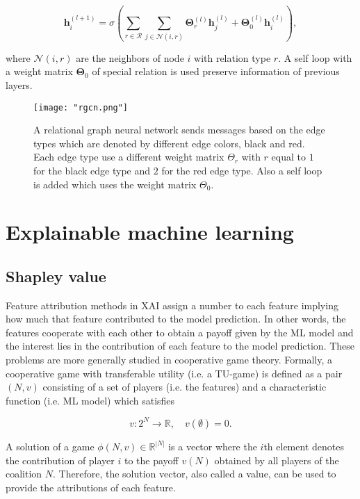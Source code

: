 \begin{equation}
	\pmb{h}^{(l+1)}_i = \sigma \left( \sum_{r \in \mathcal{R}} \sum_{j \in \mathcal{N}(i, r)} \pmb{\Theta}^{(l)}_r \pmb{h}^{(l)}_j
	+ \pmb{\Theta}^{(l)}_0 \pmb{h}^{(l)}_i \right),
\end{equation}


where $\mathcal{N}(i, r)$ are the neighbors of node $i$ with relation type $r$.
A self loop with a weight matrix $\pmb{\Theta}_0$ of special relation
is used preserve information of previous layers.

\begin{figure}[h]
    \centering 
    \texttt{[image: "rgcn.png"]}
    \caption{A relational graph neural network sends messages based on the edge 
    types which are denoted by different edge colors, black and red. Each edge 
    type use a different weight matrix $\Theta_r$ with $r$ equal to $1$ for the black 
    edge type and $2$ for the red edge type. Also a self loop is added which uses 
    the weight matrix $\Theta_0$.}
    \label{fig:rgcn}
\end{figure}


\section{Explainable machine learning}


\subsection{Shapley value}
\label{subsec:shapley_value}

Feature attribution methods in XAI assign a number to each feature implying how
much that feature contributed to the model prediction.\cite{merrick2020explanation}
In other words, the features cooperate with each other to obtain a payoff given
by the ML model and the interest lies in the contribution of each feature to the
model prediction. These problems are more generally studied in cooperative game
theory. Formally, a cooperative game with transferable utility (i.e. a TU-game) is
defined as a pair $(N, v)$ consisting of a set of players (i.e. the features)
and a characteristic function (i.e. ML model) which satisfies\cite{zhang2022gstarx}


\begin{equation}
	v: 2^N \rightarrow \mathbb{R}, \quad v\left(\emptyset\right) = 0.
\end{equation}


A solution of a game $\phi(N, v) \in \mathbb{R}^{|N|}$ is a vector where the $i$th element
denotes the contribution of player $i$ to the payoff $v(N)$ obtained by all players
of the coalition $N$.\cite{zhang2022gstarx} Therefore, the solution vector,
also called a value, can be used to provide the attributions of each feature.



